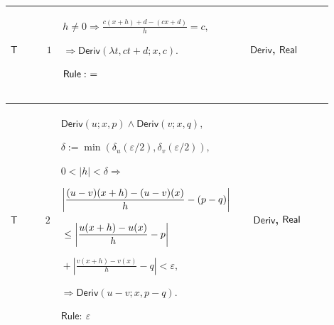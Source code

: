 \documentclass[12pt,reqno]{amsart}
\theoremstyle{blueplain}
\numberwithin{equation}{section}
\begin{document}
{\scriptsize \setlength{\parskip}{0pt}\nointerlineskip
\noindent 
\begin{tabular}{|@{}>{\centering\arraybackslash}m{0.10658\linewidth}|>{\centering\arraybackslash}m{0.03553\linewidth}|>{\centering\arraybackslash}m{0.52105\linewidth}|>{\centering\arraybackslash}m{0.23684\linewidth}|}
\hline
\hypertarget{proof:T1}{$\displaystyle \mathsf{T}$} & $\displaystyle 1$ & $%
\displaystyle h\ne0\Rightarrow\frac{c(x+h)+d-(cx+d)}h=c,$\par$\displaystyle %
\Rightarrow\mathsf{Deriv}(\lambda t,ct+d;x,c).$\par$\displaystyle \mathsf{%
Rule}:\ =$ & \hyperlink{def:Deriv}{$\displaystyle \mathsf{Deriv}$}, 
\hyperlink{ax:Real}{$\displaystyle \mathsf{Real}$} \\ \hline
\end{tabular}%
}

{\scriptsize \setlength{\parskip}{0pt}\nointerlineskip
\noindent 
\begin{tabular}{|@{}>{\centering\arraybackslash}m{0.10658\linewidth}|>{\centering\arraybackslash}m{0.03553\linewidth}|>{\centering\arraybackslash}m{0.52105\linewidth}|>{\centering\arraybackslash}m{0.23684\linewidth}|}
\hline
\hypertarget{proof:T2}{$\displaystyle \mathsf{T}$} & $\displaystyle 2$ & $%
\displaystyle \mathsf{Deriv}(u;x,p)\land\mathsf{Deriv}(v;x,q),$\par$%
\displaystyle \delta:=\min(\delta_u(\varepsilon/2),\delta_v(\varepsilon/2)),$%
\par$\displaystyle 0<|h|<\delta\Rightarrow$\par$\displaystyle \left|\frac{%
(u-v)(x+h)-(u-v)(x)}h-(p-q)\right|$\par$\displaystyle {}\le\left|\frac{%
u(x+h)-u(x)}h-p\right|$\par$\displaystyle {}+\left|\frac{v(x+h)-v(x)}%
h-q\right|<\varepsilon,$\par$\displaystyle \Rightarrow\mathsf{Deriv}%
(u-v;x,p-q).$\par$\displaystyle \mathsf{Rule}:\ \varepsilon$ & \hyperlink{def:Deriv}%
{$\displaystyle \mathsf{Deriv}$}, \hyperlink{ax:Real}{$\displaystyle \mathsf{%
Real}$} \\ \hline
\end{tabular}%
}
\end{document}
